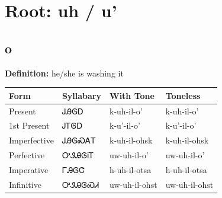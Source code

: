 \documentclass{article}%
\begin{document}
%
\normalsize%
\section*{Root: uh / u'}%
\subsection*{o}%
\textbf{Definition: }%
he/she is washing it%
\\[0.5em]%
\begin{tabular}{|l|l|l|l|}%
\hline%
\textbf{Form}&\textbf{Syllabary}&\textbf{With Tone}&\textbf{Toneless}\\%
\hline%
Present&ᎫᎯᎶᎠ&k{-}uh{-}il{-}o'&k{-}uh{-}il{-}o'\\%
1st Present&ᎫᎢᎶᎠ&k{-}u'{-}il{-}o'&k{-}u'{-}il{-}o'\\%
Imperfective&ᎫᎯᎶᏍᎪᎢ&k{-}uh{-}il{-}ohsk&k{-}uh{-}il{-}ohsk\\%
Perfective&ᎤᏭᎯᎶᎥᎢ&uw{-}uh{-}il{-}o'&uw{-}uh{-}il{-}o'\\%
Imperative&ᎱᎯᎶᏣ&h{-}uh{-}il{-}otsa&h{-}uh{-}il{-}otsa\\%
Infinitive&ᎤᏭᎯᎶᏍᏗ&uw{-}uh{-}il{-}ohst&uw{-}uh{-}il{-}ohst\\%
\hline%
\end{tabular}%
\\[1em]%
\end{document}
